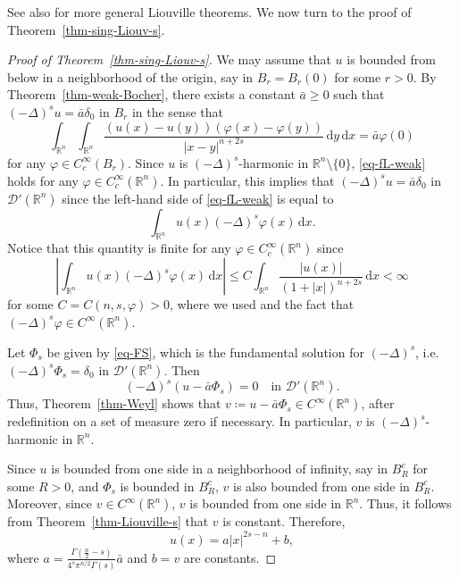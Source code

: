 \documentclass[11pt]{amsart}
\theoremstyle{plain}
\theoremstyle{definition}
\numberwithin{equation}{section}
\begin{document}
See also \cite{AdTEJ20,CDL15,Fal16,FW16,GK25} for more general Liouville theorems. We now turn to the proof of Theorem~\ref{thm-sing-Liouv-s}.

\begin{proof}[Proof of Theorem~\ref{thm-sing-Liouv-s}]
We may assume that $u$ is bounded from below in a neighborhood of the origin, say in $B_r=B_r(0)$ for some $r>0$. By Theorem~\ref{thm-weak-Bocher}, there exists a constant $\bar{a} \geq 0$ such that $(-\Delta)^su=\bar{a}\delta_0$ in $B_r$ in the sense that
\begin{equation}\label{eq-fL-weak}
    \int_{\mathbb{R}^n} \int_{\mathbb{R}^n} \frac{(u(x)-u(y))(\varphi(x)-\varphi(y))}{|x-y|^{n+2s}} \,\mathrm{d}y \,\mathrm{d}x = \bar{a} \varphi(0)
\end{equation}
for any $\varphi \in C^\infty_c(B_r)$. Since $u$ is $(-\Delta)^s$-harmonic in $\mathbb{R}^n \setminus \{0\}$, \eqref{eq-fL-weak} holds for any $\varphi \in C^\infty_c(\mathbb{R}^n)$. In particular, this implies that $(-\Delta)^su=\bar{a}\delta_0$ in $\mathscr{D}'(\mathbb{R}^n)$ since the left-hand side of \eqref{eq-fL-weak} is equal to
\begin{equation*}
    \int_{\mathbb{R}^n} u(x)(-\Delta)^s \varphi(x) \,\mathrm{d}x.
\end{equation*}
Notice that this quantity is finite for any $\varphi \in C^\infty_c(\mathbb{R}^n)$ since
\begin{equation*}
    \left| \int_{\mathbb{R}^n} u(x)(-\Delta)^s \varphi(x) \,\mathrm{d}x \right| \leq C \int_{\mathbb{R}^n} \frac{|u(x)|}{(1+|x|)^{n+2s}} \,\mathrm{d}x < \infty
\end{equation*}
for some $C=C(n, s, \varphi)>0$, where we used \cite[Proposition~2.9]{Gar19} and the fact that $(-\Delta)^s\varphi \in C^\infty(\mathbb{R}^n)$.

Let $\Phi_s$ be given by \eqref{eq-FS}, which is the fundamental solution for $(-\Delta)^s$, i.e.\ $(-\Delta)^s\Phi_s=\delta_0$ in $\mathscr{D}'(\mathbb{R}^n)$. Then
\begin{equation*}
    (-\Delta)^s(u-\bar{a}\Phi_s)=0\quad\text{in }\mathscr{D}'(\mathbb{R}^n).
\end{equation*}
Thus, Theorem~\ref{thm-Weyl} shows that $v\coloneqq u-\bar{a}\Phi_s \in C^\infty(\mathbb{R}^n)$, after redefinition on a set of measure zero if necessary. In particular, $v$ is $(-\Delta)^s$-harmonic in $\mathbb{R}^n$.

Since $u$ is bounded from one side in a neighborhood of infinity, say in $B_R^c$ for some $R>0$, and $\Phi_s$ is bounded in $B_R^c$, $v$ is also bounded from one side in $B_R^c$. Moreover, since $v \in C^\infty(\mathbb{R}^n)$, $v$ is bounded from one side in $\mathbb{R}^n$. Thus, it follows from Theorem~\ref{thm-Liouville-s} that $v$ is constant. Therefore,
\begin{equation*}
    u(x)=a|x|^{2s-n}+b,
\end{equation*}
where $a=\frac{\Gamma(\frac{n}{2}-s)}{4^{s}\pi^{n/2}\Gamma(s)}\bar{a}$ and $b=v$ are constants.
\end{proof}
\end{document}
